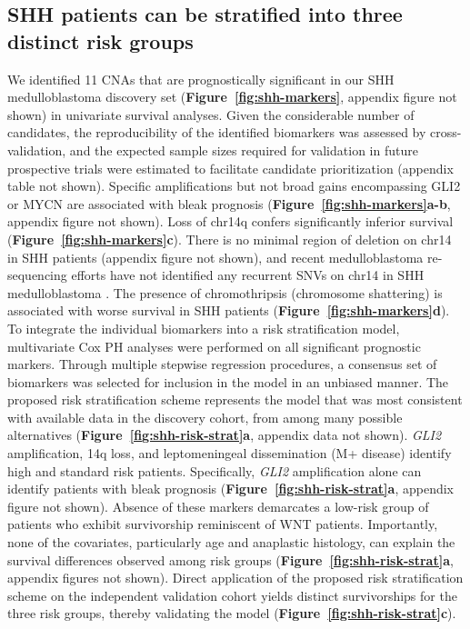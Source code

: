 \documentclass[11pt,letterpaper]{article}
\theoremstyle{definition}
\newcommand{\citefig}[1]{\textbf{Figure~\ref{fig:#1}}}
\begin{document}
\subsection{SHH patients can be stratified into three distinct risk groups}

We identified 11 CNAs that are prognostically significant in our SHH medulloblastoma discovery set (\citefig{shh-markers}, appendix figure not shown) in univariate survival analyses. Given the considerable number of candidates, the reproducibility of the identified biomarkers was assessed by cross-validation, and the expected sample sizes required for validation in future prospective trials were estimated to facilitate candidate prioritization (appendix table not shown). Specific amplifications but not broad gains encompassing GLI2 or MYCN are associated with bleak prognosis (\citefig{shh-markers}\textbf{a-b}, appendix figure not shown). Loss of chr14q confers significantly inferior survival (\citefig{shh-markers}\textbf{c}). There is no minimal region of deletion on chr14 in SHH patients (appendix figure not shown), and recent medulloblastoma re-sequencing efforts have not identified any recurrent SNVs on chr14 in SHH medulloblastoma . The presence of chromothripsis (chromosome shattering) is associated with worse survival in SHH patients (\citefig{shh-markers}\textbf{d}).
To integrate the individual biomarkers into a risk stratification model, multivariate Cox PH analyses were performed on all significant prognostic markers. Through multiple stepwise regression procedures, a consensus set of biomarkers was selected for inclusion in the model in an unbiased manner. The proposed risk stratification scheme represents the model that was most consistent with available data in the discovery cohort, from among many possible alternatives (\citefig{shh-risk-strat}\textbf{a}, appendix data not shown). \emph{GLI2} amplification, 14q loss, and leptomeningeal dissemination (M+ disease) identify high and standard risk patients. Specifically, \emph{GLI2} amplification alone can identify patients with bleak prognosis (\citefig{shh-risk-strat}\textbf{a}, appendix figure not shown). Absence of these markers demarcates a low-risk group of patients who exhibit survivorship reminiscent of WNT patients. Importantly, none of the covariates, particularly age and anaplastic histology, can explain the survival differences observed among risk groups (\citefig{shh-risk-strat}\textbf{a}, appendix figures not shown). Direct application of the proposed risk stratification scheme on the independent validation cohort yields distinct survivorships for the three risk groups, thereby validating the model (\citefig{shh-risk-strat}\textbf{c}).
\end{document}
